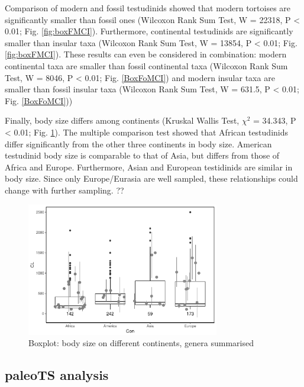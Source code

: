 Comparison of modern and fossil testudinids showed that modern tortoises are significantly smaller than fossil ones (Wilcoxon Rank Sum Test, W = 22318, P < 0.01; Fig. \ref{fig:boxFMCI}). Furthermore, continental testudinids are significantly smaller than insular taxa (Wilcoxon Rank Sum Test, W = 13854, P < 0.01; Fig. \ref{fig:boxFMCI}).
These results can even be considered in combination: modern continental taxa are smaller than fossil continental taxa (Wilcoxon Rank Sum Test, W = 8046, P < 0.01; Fig. \ref{BoxFoMCI}) and modern insular taxa are smaller than fossil insular taxa (Wilcoxon Rank Sum Test, W = 631.5, P < 0.01; Fig. \ref{BoxFoMCI}))

Finally, body size differs among continents (Kruskal Wallis Test, $\chi^2$ = 34.343, P < 0.01; Fig. \ref{fig:boxCon}). The multiple comparison test showed that African testudinids differ significantly from the other three continents in body size. American testudinid body size is comparable to that of Asia, but differs from those of Africa and Europe. Furthermore, Asian and European testidinids are similar in body size. Since only Europe/Eurasia are well sampled, these relationships could change with further sampling. ??


\begin{figure}[htbp]
	\centering
	\includegraphics[width=0.75\textwidth]{MA_JJ_files/figure-latex/BPCon-1.pdf}
	\caption{Boxplot: body size on different continents, genera summarised}
	\label{fig:boxCon}
\end{figure}



\FloatBarrier

\subsection{paleoTS analysis}\label{paleots-analysis}





